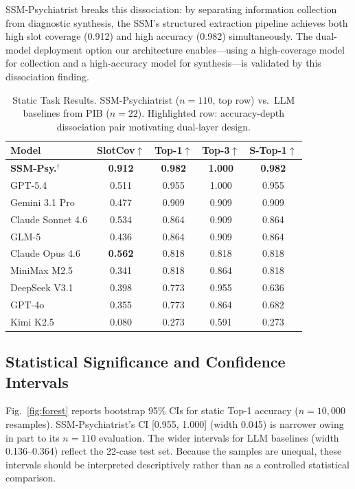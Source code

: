 \documentclass[conference]{IEEEtran}
\begin{document}
SSM-Psychiatrist breaks this dissociation: by separating information collection from diagnostic synthesis, the SSM's structured extraction pipeline achieves both high slot coverage (0.912) and high accuracy (0.982) simultaneously. The dual-model deployment option our architecture enables---using a high-coverage model for collection and a high-accuracy model for synthesis---is validated by this dissociation finding.

\begin{table}[htbp]
\caption{Static Task Results. SSM-Psychiatrist ($n=110$, top row) vs.\ LLM baselines from PIB ($n=22$). Highlighted row: accuracy-depth dissociation pair motivating dual-layer design.}
\label{tab:static}
\begin{center}
\begin{tabular}{lcccc}
\toprule
\textbf{Model} & \textbf{SlotCov$\uparrow$} & \textbf{Top-1$\uparrow$} & \textbf{Top-3$\uparrow$} & \textbf{S-Top-1$\uparrow$} \\
\midrule
\rowcolor[gray]{0.88}
\textbf{SSM-Psy.}$^\dagger$   & \textbf{0.912} & \textbf{0.982} & \textbf{1.000} & \textbf{0.982} \\
\midrule
GPT-5.4           & 0.511 & 0.955 & 1.000 & 0.955 \\
Gemini 3.1 Pro    & 0.477 & 0.909 & 0.909 & 0.909 \\
Claude Sonnet 4.6 & 0.534 & 0.864 & 0.909 & 0.864 \\
GLM-5             & 0.436 & 0.864 & 0.909 & 0.864 \\
\rowcolor[gray]{0.92}
Claude Opus 4.6   & \textbf{0.562} & 0.818 & 0.818 & 0.818 \\
MiniMax M2.5      & 0.341 & 0.818 & 0.864 & 0.818 \\
DeepSeek V3.1     & 0.398 & 0.773 & 0.955 & 0.636 \\
GPT-4o            & 0.355 & 0.773 & 0.864 & 0.682 \\
Kimi K2.5         & 0.080 & 0.273 & 0.591 & 0.273 \\
\bottomrule
\end{tabular}
\end{center}
\end{table}



\subsection{Statistical Significance and Confidence Intervals}

Fig.~\ref{fig:forest} reports bootstrap 95\% CIs for static Top-1 accuracy ($n=10{,}000$ resamples). SSM-Psychiatrist's CI [0.955, 1.000] (width 0.045) is narrower owing in part to its $n=110$ evaluation. The wider intervals for LLM baselines (width 0.136--0.364) reflect the 22-case test set. Because the samples are unequal, these intervals should be interpreted descriptively rather than as a controlled statistical comparison.
\end{document}
